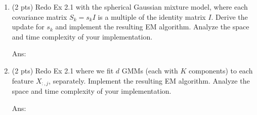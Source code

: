 \documentclass[10pt,letter,notitlepage]{article}
\newcommand{\xv}{\mathbf{x}}
\newcommand{\blue}[1]{{\color{blue}#1}}
\newcommand{\ans}[1]{{\color{orange}\textsf{Ans}: #1}}
\newcounter{exercise}
\begin{document}
\begin{exercise}
\begin{enumerate}
		[You might want to review the steps we took in class (lecture 16) to get the updates in \Cref{alg:gmm} and adapt them to the simpler case here. The solution should look like $s_j = \frac{\sum_{i=1}^n r_{ik} (x_{ij} - \mu_j)^2}{\sum_{i=1}^n r_{ik} } = \frac{\sum_{i=1}^n r_{ik} x_{ij} ^2}{\sum_{i=1}^n r_{ik} } - \mu_j^2$ for the $j$-th diagonal. Multiplying an $n\times p$ matrix with a $p\times m$ matrix costs $O(mnp)$. Do not maintain a diagonal matrix explicitly; using a vector for its diagonal suffices.]
		
		To stop the algorithm, set a maximum number of iterations (say $\textsc{maxiter} = 500$) and also monitor the change of the negative log-likelihood $\ell$: 
		\begin{align}
		\ell = -\sum_{i=1}^n \log\left[\sum_{k=1}^K \pi_k |2\pi S_k|^{-1/2} \exp[ -\tfrac{1}{2}(\xv_i -\boldsymbol{\mu}_k)^\top S_k^{-1} (\xv_i - \boldsymbol{\mu}_k ) ]\right],
		\end{align}
		where $\xv_i$ is the $i$-th column of $X^\top$.
		\blue{As a debug tool, note that $\ell$ should decrease from step to step}, and we can stop the algorithm if the decrease is smaller than a predefined threshold, say $\textsc{tol} = 10^{-5}$.
		
		\ans{}
			
		\item (2 pts) Redo Ex 2.1 with the \blue{spherical} Gaussian mixture model, where each covariance matrix $S_k = s_k I$ is a multiple of the identity matrix $I$. Derive the update for $s_k$ and implement the resulting EM algorithm. Analyze the space and time complexity of your implementation.
		
		\ans{}
				
		\item (2 pts) Redo Ex 2.1 where we fit $d$ GMMs (each with $K$ components) to each feature $X_{:,j}$, separately. Implement the resulting EM algorithm. Analyze the space and time complexity of your implementation.
		
		\ans{}
		

\end{enumerate}
\end{exercise}
\end{document}
